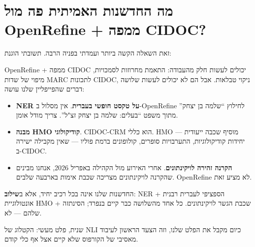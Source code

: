 \documentclass[12pt,a4paper]{article}
\begin{document}
\section{\texthebrew{מה החדשנות האמיתית פה מול OpenRefine + ממפה CIDOC?}}
\begin{hebrew}
זאת השאלה הקשה ביותר ועמדתי בפניה הרבה. תשובתי הוגנת:
\par
OpenRefine + ממפה CIDOC יכולים לעשות חלק מהעבודה: התאמת מחרוזות לסמכויות, מיפוי של שדות MARC לתכונות CIDOC, ניקוי טבלאות. אבל הם לא יכולים לעשות שלושה דברים שהפייפליין שלנו עושה:
\begin{itemize}
  \item \textbf{NER על טקסט חופשי בעברית}. אין מסלול ב-OpenRefine לחילוץ ``שלמה בן יצחק'' מתוך משפט ``בעלים: שלמה בן יצחק זצ"ל''. צריך מודל אומן.
  \item \textbf{מבנה HMO קודיקולוגי}. CIDOC-CRM הוא כללי. HMO מוסיף שכבה ייעודית — יחידות קודיקולוגיות, התערבויות סופרים, קולופונים ברמת פוליו — שאין מקבילה ישירה ב-CIDOC.
  \item \textbf{הקרנה זהירה לויקינתונים}. אחרי האירוע מול הקהילה באפריל 2026, אנחנו מבינים שהקרנה לויקינתונים מצריכה שכבת אימות בארבעה שלבים. OpenRefine לא מציע זאת.
\end{itemize}
\par
החדשנות שלנו אינה בכל רכיב יחיד, אלא ב\textbf{שילוב}: NER הספציפי לעברית רבנית + אונטולוגיית HMO + שכבת הגשר לויקינתונים. כל אחד מהשלושה כבר קיים בנפרד; הסינתזה שלהם — לא.
\par
שנית, פלט מעשי: הקטלוג של NLI כיום מקבל את הפלט שלנו, וזה הצעד הראשון לעיבוד מאסיבי של הקורפוס שלא קיים אצל אף כלי קודם.
\end{hebrew}
\end{document}
